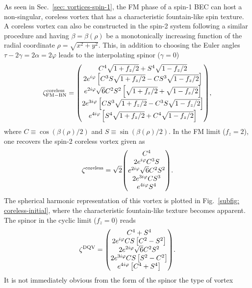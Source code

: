 As seen in Sec.~\ref{sec: vortices-spin-1}, the FM phase of a spin-1 BEC can
host a non-singular, coreless vortex that has a characteristic fountain-like
spin texture.
A coreless vortex can also be constructed in the spin-2 system following a
similar procedure and having \(\beta=\beta(\rho)\) be a monotonically increasing
function of the radial coordinate \(\rho = \sqrt{x^2 + y^2}\).
This, in addition to choosing the Euler angles
\(\tau - 2\gamma = 2\alpha = 2\varphi \) leads to the interpolating spinor
(\(\gamma=0\))
\begin{equation}\label{eq: FM-BN-coreless-DQV}
    \zeta_\mathrm{FM-BN}^\mathrm{coreless} = \mqty(
    C^4\sqrt{1+f_z/2} + S^4\sqrt{1-f_z/2} \\
    2e^{i\varphi}\left[C^3S\sqrt{1+f_z/2}
        - CS^3\sqrt{1-f_z/2}\right] \\
    e^{2i\varphi}\sqrt{6}C^2S^2\left[\sqrt{1+f_z/2}
        + \sqrt{1-f_z/2} \right] \\
    2e^{3i\varphi}\left[CS^3\sqrt{1+f_z/2}
        - C^3S\sqrt{1-f_z/2}\right] \\
    e^{4i\varphi}\left[S^4\sqrt{1+f_z/2} + C^4\sqrt{1-f_z/2} \right]
    ),
\end{equation}
where \(C \equiv \cos(\beta(\rho)/2)\) and \(S \equiv \sin(\beta(\rho)/2)\).
In the FM limit (\(f_z=2\)), one recovers the spin-2 coreless vortex given as
\begin{equation}\label{eq: FM-BN-coreless}
    \zeta^\mathrm{coreless} = \sqrt{2}\mqty(C^4 \\ 2e^{i\varphi}C^3S \\
    e^{2i\varphi}\sqrt{6}C^2S^2 \\ 2e^{3i\varphi}CS^3 \\ e^{4i\varphi}S^4
    ).
\end{equation}
The spherical harmonic representation of this vortex is plotted in
Fig.~\ref{subfig: coreless-initial}, where the characteristic fountain-like
texture becomes apparent.
The spinor in the cyclic limit (\(f_z=0\)) reads
\begin{equation}\label{eq: FM-BN-DQV}
    \zeta^\mathrm{DQV} = \mqty(
    C^4 + S^4 \\
    2e^{i\varphi}CS\left[C^2-S^2\right] \\
    2e^{2i\varphi}\sqrt{6}C^2S^2 \\
    2e^{3i\varphi}CS\left[S^2 - C^2\right] \\
    e^{4i\varphi}\left[C^4 + S^4\right]).
\end{equation}
It is not immediately obvious from the form of the spinor the type of vortex
